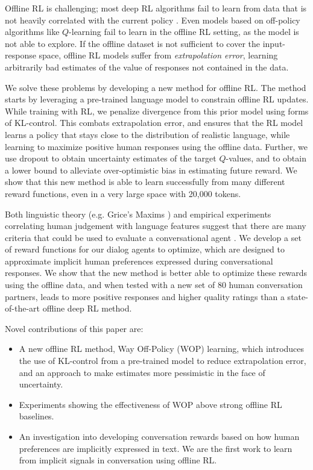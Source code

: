 Offline RL is challenging; most deep RL algorithms fail to learn from data that is not heavily correlated with the current policy \citep{fujimoto2018off}. Even models based on off-policy algorithms like $Q$-learning fail to learn in the offline RL setting, as the model is not able to explore. If the offline dataset is not sufficient to cover the input-response space, offline RL models suffer from \textit{extrapolation error}, learning arbitrarily bad estimates of the value of responses not contained in the data. 

We solve these problems by developing a new method for offline RL.  The method starts by leveraging a pre-trained language model to constrain offline RL updates. While training with RL, we penalize divergence from this prior model using forms of KL-control. This combats extrapolation error, and ensures that the RL model learns a policy that stays close to the distribution of realistic language, while learning to maximize positive human responses using the offline data. Further, we use dropout to obtain uncertainty estimates of the target $Q$-values, and to obtain a lower bound to alleviate over-optimistic bias in estimating future reward. We show that this new method is able to learn successfully from many different reward functions, even in a very large space with 20,000 tokens.

Both linguistic theory (e.g. Grice's Maxims \cite{grice1975logic}) and empirical experiments correlating human judgement with language features suggest that there are many criteria that could be used to evaluate a conversational agent  \cite{ghandeharioun2019approximating, adiwardana2020towards}. We develop a set of reward functions for our dialog agents to optimize, which are designed to approximate implicit human preferences expressed during conversational responses. We show that the new method is better able to optimize these rewards using the offline data, and when tested with a new set of 80 human conversation partners, leads to more positive responses and higher quality ratings than a state-of-the-art offline deep RL method.

Novel contributions of this paper are:

\begin{itemize}
    \item A new offline RL method, Way Off-Policy (WOP) learning, which introduces the use of KL-control from a pre-trained model to reduce extrapolation error, and an approach to make estimates more pessimistic in the face of uncertainty.
    \item Experiments showing the effectiveness of WOP above strong offline RL baselines.
    \item An investigation into developing conversation rewards based on how human preferences are implicitly expressed in text. We are the first work to learn from implicit signals in conversation using offline RL.
\end{itemize}

